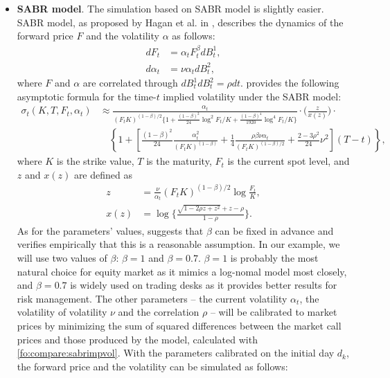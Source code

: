 \documentclass{article}
\numberwithin{equation}{section}
\begin{document}
\begin{itemize}
\begin{itemize}
\item Step 2: Simulate the intensity $\kappa_{t+\Delta t}$ via \eqref{eq.dtl.Euler}.
\end{itemize}
Repeating the two steps $u$ times, we simulate the L\'evy measure $\kappa$ and the underlying $S$ in $u$ days. We then use the iterative formula \eqref{fo:dtL:PDEsol} to calculate time-$u$ time values, from which we deduce the time-$u$ option prices and estimate the covariance matrix, to obtain the optimal portfolio weights. 

\item {\bf SABR model}. 
The simulation based on SABR model is slightly easier. SABR model, as proposed by Hagan et al. in \cite{hagan2002managing},  describes the dynamics of the forward price $F$ and the volatility $\alpha$ as follows:
\begin{align}\label{fo:compare:sabr}
dF_t & = \alpha_t F_t^\beta dB_t^1, \nonumber \\
d\alpha_t & = \nu \alpha_t dB_t^2,
\end{align}
where $F$ and $\alpha$ are correlated through $dB_t^1 dB_t^2 = \rho dt$. \cite{hagan2002managing} provides the following asymptotic formula for the time-$t$ implied volatility under the SABR model:
\begin{align}\label{fo:compare:sabrimpvol}
\sigma_t(K,T,F_t,\alpha_t) & \approx \frac{\alpha_t}{(F_t K)^{(1-\beta)/2}\big\{1+\frac{(1-\beta)^2}{24}\log^2 F_t/K + \frac{(1-\beta)^4}{1920} \log^4 F_t/K \big\}} \cdot \bigg(\frac{z}{x(z)}\bigg) \cdot \nonumber \\
& \quad \left\{1 + \left[\frac{(1-\beta)^2}{24} \frac{\alpha_t^2}{(F_t K)^{(1-\beta)}} + \frac{1}{4} \frac{\rho\beta\nu\alpha_t}{(F_tK)^{(1-\beta)/2}} + \frac{2-3\rho^2}{24} \nu^2 \right] (T-t) \right\}, 
\end{align}
where $K$ is the strike value, $T$ is the maturity, $F_t$ is the current spot level, and $z$ and $x(z)$ are defined as
\begin{align}
z &= \frac{\nu}{\alpha_t} (F_t K)^{(1-\beta)/2} \log \frac{F_t}{K}, \nonumber \\
x(z) &= \log \bigg\{ \frac{\sqrt{1-2\rho z + z^2} + z - \rho}{1-\rho} \bigg\}. 
\end{align}
As for the parameters' values, \cite{hagan2002managing} suggests that $\beta$ can be fixed in advance and \cite{west2005calibration} verifies empirically that this is a reasonable assumption. In our example, we will use two values of $\beta$: $\beta = 1$ and $\beta = 0.7$. $\beta = 1$ is probably the most natural choice for equity market as it mimics a log-nomal model most closely, and $\beta = 0.7$ is widely used on trading desks as it provides better results for risk management. The other parameters -- the current volatility $\alpha_t$, the volatility of volatility $\nu$ and the correlation $\rho$ -- will be calibrated to market prices by minimizing the sum of squared differences between the market call prices and those produced by the model, calculated with \eqref{fo:compare:sabrimpvol}. With the parameters calibrated on the initial day $d_k$, the forward price and the volatility can be simulated as follows: 

\end{itemize}
\end{document}
